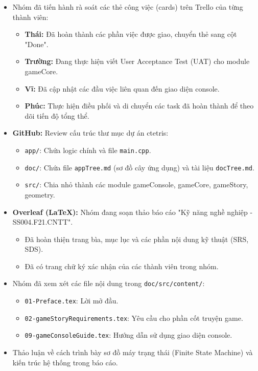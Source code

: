\documentclass[12pt,a4paper]{article}
\begin{document}
\begin{itemize}
    \item Nhóm đã tiến hành rà soát các thẻ công việc (cards) trên Trello của từng thành viên:
    \begin{itemize}
        \item \textbf{Thái:} Đã hoàn thành các phần việc được giao, chuyển thẻ sang cột "Done".
        \item \textbf{Trường:} Đang thực hiện viết User Acceptance Test (UAT) cho module gameCore.
        \item \textbf{Vĩ:} Đã cập nhật các đầu việc liên quan đến giao diện console.
        \item \textbf{Phúc:} Thực hiện điều phối và di chuyển các task đã hoàn thành để theo dõi tiến độ tổng thể.
    \end{itemize}
\end{itemize}

\begin{itemize}
    \item \textbf{GitHub:} Review cấu trúc thư mục dự án ctetris:
    \begin{itemize}
        \item \texttt{app/}: Chứa logic chính và file \texttt{main.cpp}.
        \item \texttt{doc/}: Chứa file \texttt{appTree.md} (sơ đồ cây ứng dụng) và tài liệu \texttt{docTree.md}.
        \item \texttt{src/}: Chia nhỏ thành các module gameConsole, gameCore, gameStory, geometry.
    \end{itemize}
    \item \textbf{Overleaf (LaTeX):} Nhóm đang soạn thảo báo cáo "Kỹ năng nghề nghiệp - SS004.F21.CNTT".
    \begin{itemize}
        \item Đã hoàn thiện trang bìa, mục lục và các phần nội dung kỹ thuật (SRS, SDS).
        \item Đã có trang chữ ký xác nhận của các thành viên trong nhóm.
    \end{itemize}
\end{itemize}

\begin{itemize}
    \item Nhóm đã xem xét các file nội dung trong \texttt{doc/src/content/}:
    \begin{itemize}
        \item \texttt{01-Preface.tex}: Lời mở đầu.
        \item \texttt{02-gameStoryRequirements.tex}: Yêu cầu cho phần cốt truyện game.
        \item \texttt{09-gameConsoleGuide.tex}: Hướng dẫn sử dụng giao diện console.
    \end{itemize}
    \item Thảo luận về cách trình bày sơ đồ máy trạng thái (Finite State Machine) và kiến trúc hệ thống trong báo cáo.
\end{itemize}
\end{document}
